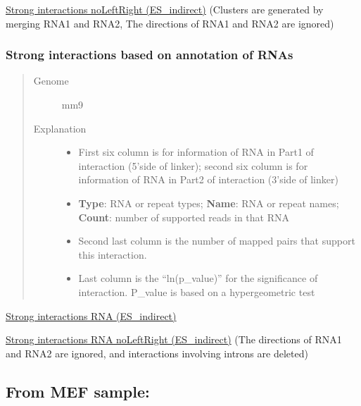 \documentclass[letterpaper,10pt,english]{sphinxmanual}
\begin{document}
\href{http://systemsbio.ucsd.edu/RNA-Hi-C/Data/AATG\_interaction\_clusters\_noLeftRight.xlsx}{Strong interactions noLeftRight (ES\_indirect)} (Clusters are generated by merging RNA1 and RNA2, The directions of RNA1 and RNA2 are ignored)


\subsubsection{Strong interactions based on annotation of RNAs}
\label{Data_Resources:id2}\begin{quote}\begin{description}
\item[{Genome}] \leavevmode
mm9

\item[{Explanation}] \leavevmode\begin{itemize}
\item {} 
First six column is for information of RNA in Part1 of interaction (5'side of linker); second six column is for information of RNA in Part2 of interaction (3'side of linker)

\item {} 
\textbf{Type}: RNA or repeat types; \textbf{Name}: RNA or repeat names; \textbf{Count}: number of supported reads in that RNA

\item {} 
Second last column is the number of mapped pairs that support this interaction.

\item {} 
Last column is the ``ln(p\_value)'' for the significance of interaction. P\_value is based on a hypergeometric test

\end{itemize}

\end{description}\end{quote}

\href{http://systemsbio.ucsd.edu/RNA-Hi-C/Data/AATG\_interaction\_clusters\_RNA.xlsx}{Strong interactions RNA (ES\_indirect)}

\href{http://systemsbio.ucsd.edu/RNA-Hi-C/Data/AATG\_interaction\_clusters\_RNA\_noLeftRight.xlsx}{Strong interactions RNA noLeftRight (ES\_indirect)} (The directions of RNA1 and RNA2 are ignored, and interactions involving introns are deleted)


\subsection{From MEF sample:}
\label{Data_Resources:from-mef-sample}
\end{document}
